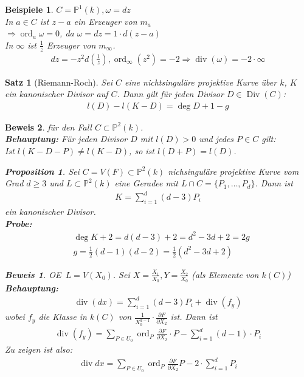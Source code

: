 \documentclass[a4paper,12pt]{report}
\theoremstyle{break}
\newtheorem{Satz}{Satz}
\newtheorem{Prop}[Def]{Proposition}
\theoremstyle{nonumberbreak}
\newtheorem{nnBsp}{Beispiele}
\theoremstyle{nonumberplain}
\newtheorem{Bew}{Beweis}
\DeclareMathOperator{\Div}{Div}
\DeclareMathOperator{\ord}{ord}
\renewcommand{\OE}{O\!\!E~}
\begin{document}
\begin{nnBsp}
  $C=\mathbb P^1(k), \omega=dz$\\
  In $a\in C$ ist $z-a$ ein Erzeuger von $m_a$\\
  $\Rightarrow\ord_a\omega=0$, da $\omega=dz=1\cdot d(z-a)$\\
  In $\infty$ ist $\frac{1}{z}$ Erzeuger von $m_\infty$.
  \begin{align*}
    dz=-z^2d(\frac{1}{z}), \ord_\infty(z^2)=-2\Rightarrow\operatorname{div}(\omega)=-2\cdot\infty
  \end{align*}
\end{nnBsp}
\begin{Satz}[Riemann-Roch]
  Sei $C$ eine nichtsinguläre projektive Kurve über $k$, $K$ ein kanonischer Divisor auf $C$. 
  Dann gilt für jeden Divisor $D\in \Div(C)$:
  \begin{align*}
    l(D)-l(K-D)=\deg D+1-g
  \end{align*}
\end{Satz}
\begin{Bew}
  für den Fall $C\subset\mathbb P^2(k)$.\\
  \textbf{Behauptung:} Für jeden Divisor $D$ mit $l(D)>0$ und jedes $P\in C$ gilt: \\
  Ist $l(K-D-P)\neq l(K-D)$, so ist $l(D+P)=l(D)$.
  \begin{Prop}
    Sei $C=V(F)\subset\mathbb P^2(k)$ nichsinguläre projektive Kurve vom Grad $d\geq 3$ und 
    $L\subset\mathbb P^2(k)$ eine Geradee mit $L\cap C=\{P_1,\dots,P_d\}$.
    Dann ist 
    \begin{align*}
      K=\sum_{i=1}^d(d-3)P_i
    \end{align*}
    ein kanonischer Divisor.\\
    \textbf{Probe:} 
    \begin{align*}
      &\deg K+2=d(d-3)+2=d^2-3d+2=2g\\
      &g=\frac{1}{2}(d-1)(d-2)=\frac{1}{2}(d^2-3d+2)
    \end{align*}
  \end{Prop}
  \begin{Bew}
    \OE $L=V(X_0)$. Sei $X=\frac{X_1}{X_0},Y=\frac{X_2}{X_0}$ (als Elemente von $k(C)$) \\
    \textbf{Behauptung:} 
    \begin{align*}
      \operatorname{div}(dx)=\sum_{i=1}^d(d-3)P_i+\operatorname{div}(f_y)
    \end{align*}
    wobei $f_y$ die Klasse in $k(C)$ von $\frac{1}{X_0^{d-1}}\cdot\frac{\partial F}{\partial X_2}$ ist.
    Dann ist 
    \begin{align*}
      \operatorname{div}(f_y)=\sum_{P\in U_0}\ord_P\frac{\partial F}{\partial X_2}\cdot P-\sum_{i=1}^d(d-1)\cdot P_i
    \end{align*}
    Zu zeigen ist also:
    \begin{align*}
      \operatorname{div}dx=\sum_{P\in U_0}\ord_P\frac{\partial F}{\partial X_2} P-2\cdot\sum_{i=1}^dP_i
    \end{align*}
  \end{Bew}
\end{Bew}
\end{document}
